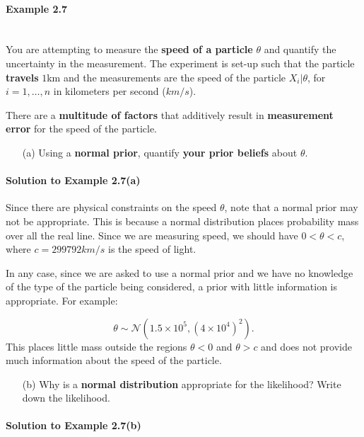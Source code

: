 \paragraph{Example 2.7}{~\\
You are attempting to measure the \textbf{\color{darkblue}speed of a particle} $\theta$ and quantify the uncertainty in the measurement. The experiment is set-up such that the particle \textbf{\color{darkblue}travels} $1$km and the measurements are the speed of the particle $X_i|\theta$, for $i = 1,\ldots, n$ in kilometers per second ($km/s$).

There are a \textbf{\color{darkblue}multitude of factors} that additively result in \textbf{\color{darkblue}measurement error} for the speed of the particle.

\begin{itemize}
\item [(a)] Using a \textbf{\color{darkblue}normal prior}, quantify \textbf{\color{darkblue}your prior beliefs} about $\theta$.
\end{itemize}

\paragraph{Solution to Example 2.7(a)}{
    
    Since there are physical constraints on the speed $\theta$, note that a normal prior may not be appropriate. This is because a normal distribution places probability mass over all the real line. Since we are measuring speed, we should have $0 < \theta < c$, where $c = 299792 km/s$ is the speed of light. 

    In any case, since we are asked to use a normal prior and we have no knowledge of the type of the particle being considered, a prior with little information is appropriate. For example:

    $$ \theta \sim \mathcal{N}(1.5\times 10^5, (4\times 10^4)^2).$$ 
    This places little mass outside the regions $\theta < 0$ and $\theta > c$ and does not provide much information about the speed of the particle.
    
    
    
}

\begin{itemize}
\item [(b)] Why is a \textbf{\color{darkblue}normal distribution} appropriate for the likelihood? Write down the likelihood.
\end{itemize}
\paragraph{Solution to Example 2.7(b)}{
    
}}
